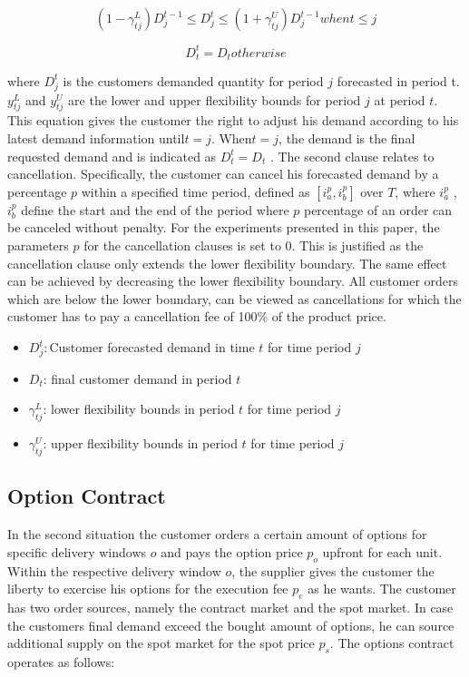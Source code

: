 \documentclass[12pt,english]{article}
\begin{document}
\[
(1-\gamma_{tj}^{L})D_{j}^{t-1}\leq D_{j}^{t}\leq(1+\gamma_{tj}^{U})D_{j}^{t-1}whent\leq j
\]

\[
D_{t}^{t}=D_{t}otherwise
\]

where $D_{j}^{t}$ is the customers demanded quantity for period $j$
forecasted in period t. $y_{tj}^{L}$ and $y_{tj}^{U}$ are the lower
and upper flexibility bounds for period $j$ at period $t$. This
equation gives the customer the right to adjust his demand according
to his latest demand information until$t=j$. When$t=j$, the demand
is the final requested demand and is indicated as $D_{t}^{t}=D_{t}$
. The second clause relates to cancellation. Specifically, the customer
can cancel his forecasted demand by a percentage $p$ within a specified
time period, defined as $[i_{a}^{p},i_{b}^{p}]$ over $T$, where
$i_{a}^{p}$ , $i_{b}^{p}$ define the start and the end of the period
where $p$ percentage of an order can be canceled without penalty.
For the experiments presented in this paper, the parameters $p$ for
the cancellation clauses is set to 0. This is justified as the cancellation
clause only extends the lower flexibility boundary. The same effect
can be achieved by decreasing the lower flexibility boundary. All
customer orders which are below the lower boundary, can be viewed
as cancellations for which the customer has to pay a cancellation
fee of 100\% of the product price.

\begin{itemize}
\item $D_{j}^{t}:$Customer forecasted demand in time $t$ for time period
$j$
\item $D_{t}$: final customer demand in period $t$
\item $\gamma_{tj}^{L}$: lower flexibility bounds in period $t$ for time
period $j$
\item $\gamma_{tj}^{U}$: upper flexibility bounds in period $t$ for time
period $j$
\end{itemize}

\subsection{Option Contract}

In the second situation the customer orders a certain amount of options
for specific delivery windows $o$ and pays the option price $p_{o}$
upfront for each unit. Within the respective delivery window $o$,
the supplier gives the customer the liberty to exercise his options
for the execution fee $p_{e}$ as he wants. The customer has two order
sources, namely the contract market and the spot market. In case the
customers final demand exceed the bought amount of options, he can
source additional supply on the spot market for the spot price $p_{s}$.
The options contract operates as follows:
\end{document}

